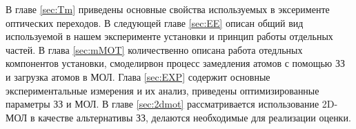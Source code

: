В главе \ref{sec:Tm} приведены основные свойства используемых в эксерименте оптических переходов.  В следующей главе \ref{sec:EE} описан общий вид используемой в нашем эксперименте установки и принцип работы отдельных частей. В глава \ref{sec:mMOT}  количественно описана работа отедльных компонентов установки, смоделирвон процесс замедления атомов с помощью ЗЗ и загрузка атомов в МОЛ. Глава \ref{sec:EXP} содержит основные экспериментальные измерения и их анализ, приведены оптимизированные параметры ЗЗ и МОЛ. В главе \ref{sec:2dmot} рассматривается использование 2D-МОЛ в качестве альтернативы ЗЗ, делаются необходимые для реализации оценки.